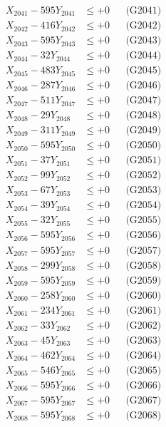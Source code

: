 \documentclass[a4paper,10pt]{article}
\begin{document}
{\begin{align}
\allowbreak
X_{2041} - 595Y_{2041} &\leq +0 && \text{(G2041)} \\
X_{2042} - 416Y_{2042} &\leq +0 && \text{(G2042)} \\
X_{2043} - 595Y_{2043} &\leq +0 && \text{(G2043)} \\
X_{2044} - 32Y_{2044} &\leq +0 && \text{(G2044)} \\
X_{2045} - 483Y_{2045} &\leq +0 && \text{(G2045)} \\
X_{2046} - 287Y_{2046} &\leq +0 && \text{(G2046)} \\
X_{2047} - 511Y_{2047} &\leq +0 && \text{(G2047)} \\
X_{2048} - 29Y_{2048} &\leq +0 && \text{(G2048)} \\
X_{2049} - 311Y_{2049} &\leq +0 && \text{(G2049)} \\
X_{2050} - 595Y_{2050} &\leq +0 && \text{(G2050)} \\
\allowbreak
X_{2051} - 37Y_{2051} &\leq +0 && \text{(G2051)} \\
X_{2052} - 99Y_{2052} &\leq +0 && \text{(G2052)} \\
X_{2053} - 67Y_{2053} &\leq +0 && \text{(G2053)} \\
X_{2054} - 39Y_{2054} &\leq +0 && \text{(G2054)} \\
X_{2055} - 32Y_{2055} &\leq +0 && \text{(G2055)} \\
X_{2056} - 595Y_{2056} &\leq +0 && \text{(G2056)} \\
X_{2057} - 595Y_{2057} &\leq +0 && \text{(G2057)} \\
X_{2058} - 299Y_{2058} &\leq +0 && \text{(G2058)} \\
X_{2059} - 595Y_{2059} &\leq +0 && \text{(G2059)} \\
X_{2060} - 258Y_{2060} &\leq +0 && \text{(G2060)} \\
\allowbreak
X_{2061} - 234Y_{2061} &\leq +0 && \text{(G2061)} \\
X_{2062} - 33Y_{2062} &\leq +0 && \text{(G2062)} \\
X_{2063} - 45Y_{2063} &\leq +0 && \text{(G2063)} \\
X_{2064} - 462Y_{2064} &\leq +0 && \text{(G2064)} \\
X_{2065} - 546Y_{2065} &\leq +0 && \text{(G2065)} \\
X_{2066} - 595Y_{2066} &\leq +0 && \text{(G2066)} \\
X_{2067} - 595Y_{2067} &\leq +0 && \text{(G2067)} \\
X_{2068} - 595Y_{2068} &\leq +0 && \text{(G2068)} \\

\end{align}}
\end{document}
